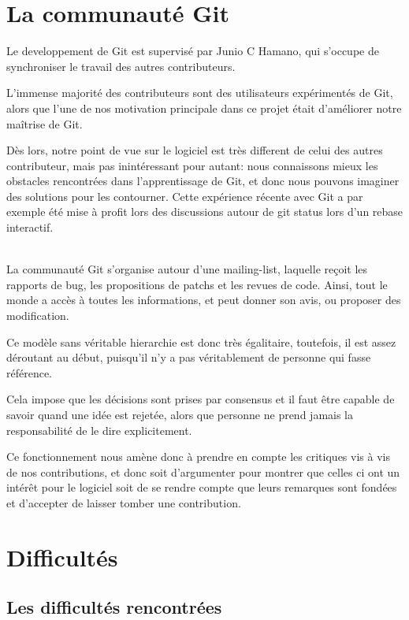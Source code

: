 \documentclass[a4paper, 12pt]{article}
\begin{document}
\section{La communauté Git}

Le developpement de Git est supervisé par Junio C Hamano, qui s'occupe de synchroniser le travail des autres contributeurs.

L'immense majorité des contributeurs sont des utilisateurs expérimentés de Git, alors que l'une de nos motivation principale dans ce projet était d'améliorer notre maîtrise de Git.

Dès lors, notre point de vue sur le logiciel est très different de celui des autres contributeur, mais pas inintéressant pour autant: nous connaissons mieux les obstacles rencontrées dans l'apprentissage de Git, et donc nous pouvons imaginer des solutions pour les contourner. Cette expérience récente avec Git a par exemple été mise à profit lors des discussions autour de git status lors d'un rebase interactif.

~\\

La communauté Git s'organise autour d'une mailing-list, laquelle reçoit les rapports de bug, les propositions de patchs et les revues de code. Ainsi, tout le monde a accès à toutes les informations, et peut donner son avis, ou proposer des modification.

Ce modèle sans véritable hierarchie est donc très égalitaire, toutefois, il est assez déroutant au début, puisqu'il n'y a pas véritablement de personne qui fasse référence.

Cela impose que les décisions sont prises par consensus et il faut être capable de savoir quand une idée est rejetée, alors que personne ne prend jamais la responsabilité de le dire explicitement.

Ce fonctionnement nous amène donc à prendre en compte les critiques vis à vis de nos contributions, et donc soit d'argumenter pour montrer que celles ci ont un intérêt pour le logiciel soit de se rendre compte que leurs remarques sont fondées et d'accepter de laisser tomber une contribution.

\section{Difficultés}

\subsection{Les difficultés rencontrées}
\end{document}
